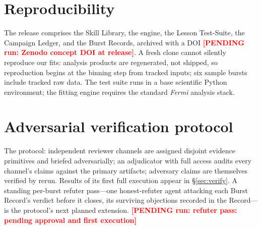 \documentclass[twocolumn]{aastex631}
\newcommand{\PENDING}[1]{\textbf{\textcolor{red}{[PENDING run: #1]}}}
\begin{document}
\appendix
\section{Reproducibility} \label{app:repro}
The release comprises the Skill Library, the engine, the Lesson
Test-Suite, the Campaign Ledger, and the Burst Records, archived with a
DOI \PENDING{Zenodo concept DOI at release}. A fresh clone cannot silently
reproduce our fits: analysis products are regenerated, not shipped, so
reproduction begins at the binning step from tracked inputs; six sample
bursts include tracked raw data. The test suite runs in a base scientific
Python environment; the fitting engine requires the standard \textit{Fermi}
analysis stack.

\section{Adversarial verification protocol} \label{app:verify}
The protocol: independent reviewer channels are assigned disjoint
evidence primitives and briefed adversarially; an adjudicator with
full access audits every channel's claims against the primary artifacts;
adversary claims are themselves verified by rerun. Results of its first
full execution appear in \S\ref{sec:verify}. A standing per-burst refuter
pass---one honest-refuter agent attacking each Burst Record's verdict before
it closes, its surviving objections recorded in the Record---is the
protocol's next planned extension. \PENDING{refuter pass: pending approval
and first execution}


\end{document}
